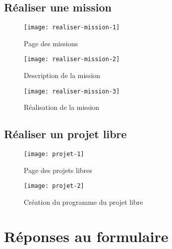 \FloatBarrier
\subsection{Réaliser une mission}
\begin{figure}[H]
  \begin{center}
    \texttt{[image: realiser-mission-1]}
    \caption{Page des missions}
    \label{fig:realiser-mission-1}
  \end{center}
\end{figure}
\begin{figure}[H]
  \begin{center}
    \texttt{[image: realiser-mission-2]}
    \caption{Description de la mission}
    \label{fig:realiser-mission-2}
  \end{center}
\end{figure}
\begin{figure}[H]
  \begin{center}
    \texttt{[image: realiser-mission-3]}
    \caption{Réalisation de la mission}
    \label{fig:realiser-mission-3}
  \end{center}
\end{figure}

\FloatBarrier
\subsection{Réaliser un projet libre}
\begin{figure}[H]
  \begin{center}
    \texttt{[image: projet-1]}
    \caption{Page des projets libres}
    \label{fig:projet-1}
  \end{center}
\end{figure}
\begin{figure}[H]
  \begin{center}
    \texttt{[image: projet-2]}
    \caption{Création du programme du projet libre}
    \label{fig:projet-2}
  \end{center}
\end{figure}

\FloatBarrier
\section{Réponses au formulaire}

